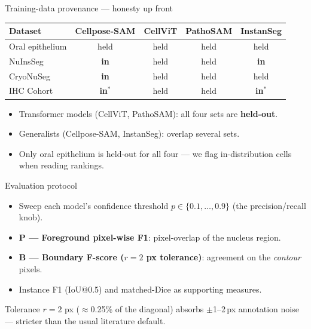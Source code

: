 \documentclass[10pt,aspectratio=169]{beamer}
\begin{document}
\begin{frame}{Training-data provenance --- honesty up front}
  \centering
  \footnotesize
  \begin{tabular}{lcccc}
    \toprule
    Dataset & Cellpose-SAM & CellViT & PathoSAM & InstanSeg \\
    \midrule
    Oral epithelium & held & held & held & held \\
    NuInsSeg        & \textbf{in} & held & held & \textbf{in} \\
    CryoNuSeg       & \textbf{in} & held & held & held \\
    IHC Cohort      & \textbf{in}$^{*}$ & held & held & \textbf{in}$^{*}$ \\
    \bottomrule
  \end{tabular}
  \vfill
  \begin{itemize}\footnotesize
    \item Transformer models (CellViT, PathoSAM): all four sets are \textbf{held-out}.
    \item Generalists (Cellpose-SAM, InstanSeg): overlap several sets.
    \item \alert{Only oral epithelium is held-out for all four} --- we flag in-distribution cells when reading rankings.
  \end{itemize}
\end{frame}

\begin{frame}{Evaluation protocol}
  \begin{itemize}
    \item Sweep each model's confidence threshold $p \in \{0.1,\dots,0.9\}$ (the precision/recall knob).
    \item \textbf{P --- Foreground pixel-wise F1}: pixel-overlap of the nucleus region.
    \item \textbf{B --- Boundary F-score ($r{=}2$ px tolerance)}: agreement on the \emph{contour} pixels.
    \item Instance F1 (IoU@0.5) and matched-Dice as supporting measures.
  \end{itemize}
  \vfill
  \centering\footnotesize
  Tolerance $r{=}2$ px ($\approx$0.25\% of the diagonal) absorbs $\pm$1--2\,px annotation noise --- stricter than the usual literature default.
\end{frame}

\end{document}

